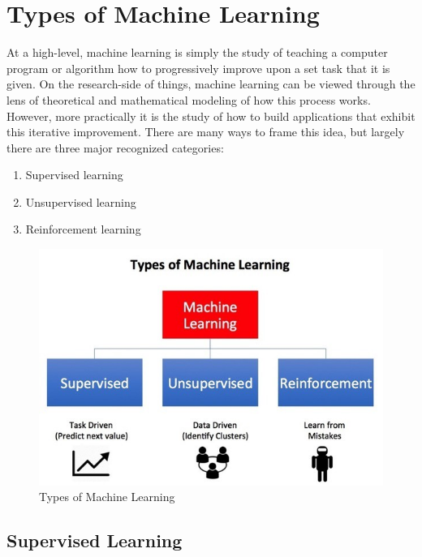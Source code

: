 \section{Types of Machine Learning}

At a high-level, machine learning is simply the study of teaching a computer program or algorithm how to progressively improve upon a set task that it is given. On the research-side of things, machine learning can be viewed through the lens of theoretical and mathematical modeling of how this process works. However, more practically it is the study of how to build applications that exhibit this iterative improvement. There are many ways to frame this idea, but largely there are three major recognized categories:
\begin{enumerate}
    \item Supervised learning
    \item Unsupervised learning
    \item Reinforcement learning
\end{enumerate}

\begin{figure}[htbp]
    \centering
	    \includegraphics[scale=0.3]{Figures/ml_types.jpg}
        \caption[Types of Machine Learning]{Types of Machine Learning}
	    \label{fig:Traditional programming vs Machine Learning}
\end{figure}

\subsection{Supervised Learning}


